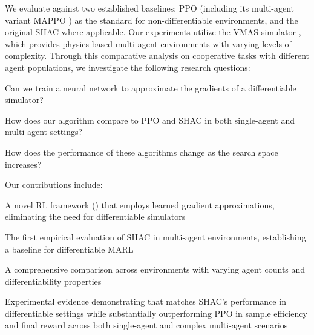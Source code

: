 We evaluate \fname{} against two established baselines: PPO \cite{Schulman17} (including its multi-agent variant MAPPO \cite{DBLP:conf/nips/YuVVGWBW22}) as the standard for non-differentiable environments, and the original SHAC \cite{Xu22} where applicable. Our experiments utilize the VMAS simulator \cite{DBLP:conf/dars/BettiniKBP22}, which provides physics-based multi-agent environments with varying levels of complexity. Through this comparative analysis on cooperative tasks with different agent populations, we investigate the following research questions:

\begin{compactitem}
    \item {} Can we train a neural network to approximate the gradients of a differentiable simulator?
    \item {} How does our algorithm compare to PPO and SHAC in both single-agent and multi-agent settings?
    \item {} How does the performance of these algorithms change as the search space increases?
\end{compactitem}

Our contributions include:
\begin{compactitem}
    \item A novel RL framework (\fname{}) that employs learned gradient approximations, eliminating the need for differentiable simulators
    \item The first empirical evaluation of SHAC in multi-agent environments, establishing a baseline for differentiable MARL
    \item A comprehensive comparison across environments with varying agent counts and differentiability properties
    \item Experimental evidence demonstrating that \fname{} matches SHAC's performance in differentiable settings while substantially outperforming PPO in sample efficiency and final reward across both single-agent and complex multi-agent scenarios
\end{compactitem}
